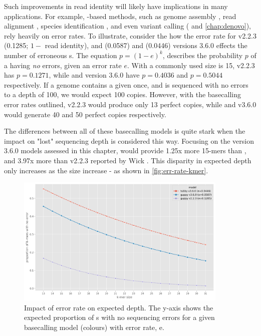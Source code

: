 Such improvements in read identity will likely have implications in many applications. For example, \kmer{}-based methods, such as genome assembly \cite{koren2017}, read alignment \cite{li2018}, species identification \cite{Breitwieser2018}, and even variant calling (\cite{iqbal2012} and \autoref{chap:denovo}), rely heavily on error rates. To illustrate, consider the how the error rate for \guppy{} v2.2.3 (0.1285; $1-$ read identity), and \guppy{} (0.0587) and \tubby{} (0.0446) versions 3.6.0 effects the number of erroneous \kmer{}s. The equation $p=(1-e)^k$, describes the probability $p$ of a \kmer{} having \emph{no} errors, given an error rate $e$. With a commonly used \ont{} \kmer{} size is 15, \guppy{} v2.2.3 has $p=0.1271$, while \guppy{} and \tubby{} version 3.6.0 have $p=0.4036$ and $p=0.5044$ respectively. If a genome contains a given \kmer{} once, and is sequenced with no errors to a depth of 100, we would expect 100 copies. However, with the \ont{} basecalling error rates outlined, \guppy{} v2.2.3 would produce only 13 perfect copies, while \guppy{} and \tubby{} v3.6.0 would generate 40 and 50 perfect copies respectively. 

The differences between all of these basecalling models is quite stark when the impact on "lost" sequencing depth is considered this way. Focusing on the version 3.6.0 models assessed in this chapter, \tubby{} would provide 1.25x more 15-mers than \guppy{}, and 3.97x more than \guppy{} v2.2.3 reported by Wick \etal{}. This disparity in expected \kmer{} depth only increases as the \kmer{} size increase - as shown in \autoref{fig:err-rate-kmer}.

\begin{figure}
\includegraphics[width=0.9\textwidth]{Chapter4/Figs/error_rate_k.png}
\centering
\caption{Impact of error rate on expected \kmer{} depth. The y-axis shows the expected proportion of \kmer{}s with no sequencing errors for a given basecalling model (colours) with error rate, e.}
\label{fig:err-rate-kmer}
\end{figure}

